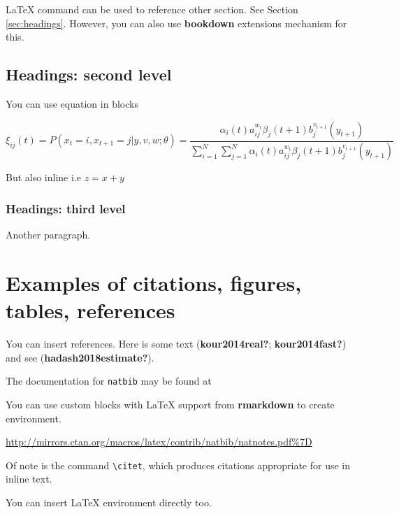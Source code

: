 \documentclass{article}
\begin{document}
\label{sec:headings}

LaTeX command can be used to reference other section. See Section
\ref{sec:headings}. However, you can also use \textbf{bookdown}
extensions mechanism for this.

\hypertarget{headings-second-level}{%
\subsection{Headings: second level}\label{headings-second-level}}

You can use equation in blocks

\[
\xi _{ij}(t)=P(x_{t}=i,x_{t+1}=j|y,v,w;\theta)= {\frac {\alpha _{i}(t)a^{w_t}_{ij}\beta _{j}(t+1)b^{v_{t+1}}_{j}(y_{t+1})}{\sum _{i=1}^{N} \sum _{j=1}^{N} \alpha _{i}(t)a^{w_t}_{ij}\beta _{j}(t+1)b^{v_{t+1}}_{j}(y_{t+1})}}
\]

But also inline i.e \(z=x+y\)

\hypertarget{headings-third-level}{%
\subsubsection{Headings: third level}\label{headings-third-level}}

Another paragraph.

\hypertarget{examples-of-citations-figures-tables-references}{%
\section{Examples of citations, figures, tables,
references}\label{examples-of-citations-figures-tables-references}}

\label{sec:others}

You can insert references. Here is some text (\textbf{kour2014real?};
\textbf{kour2014fast?}) and see (\textbf{hadash2018estimate?}).

The documentation for \verb+natbib+ may be found at

You can use custom blocks with LaTeX support from \textbf{rmarkdown} to
create environment.

\begin{center}
\url{http://mirrors.ctan.org/macros/latex/contrib/natbib/natnotes.pdf\%7D}

\end{center}

Of note is the command \verb+\citet+, which produces citations
appropriate for use in inline text.

You can insert LaTeX environment directly too.
\end{document}
